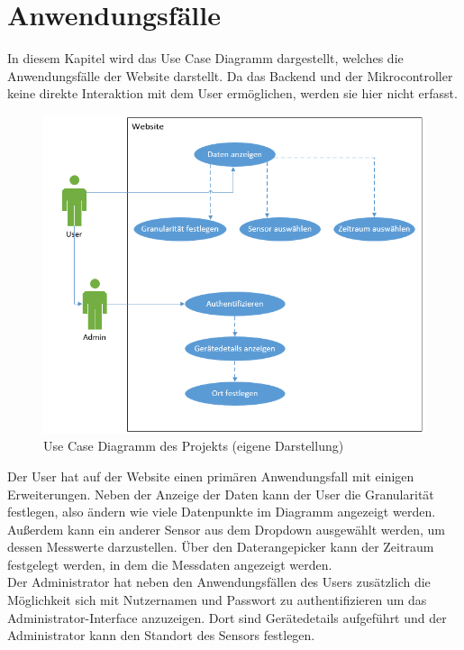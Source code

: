 \section{Anwendungsfälle}
In diesem Kapitel wird das Use Case Diagramm dargestellt, welches die Anwendungsfälle der Website darstellt. Da das Backend und der Mikrocontroller keine direkte Interaktion mit dem User ermöglichen, werden sie hier nicht erfasst.\\
\begin{figure}[h]
    \centering
    \includegraphics[width=0.7\linewidth]{img/usecase}
    \caption[Use Case Diagramm des Projekts]{Use Case Diagramm des Projekts (eigene Darstellung)}
    \label{fig:usecase}
\end{figure}

Der User hat auf der Website einen primären Anwendungsfall mit einigen Erweiterungen. Neben der Anzeige der Daten kann der User die Granularität festlegen, also ändern wie viele Datenpunkte im Diagramm angezeigt werden. Außerdem kann ein anderer Sensor aus dem Dropdown ausgewählt werden, um dessen Messwerte darzustellen. Über den Daterangepicker kann der Zeitraum festgelegt werden, in dem die Messdaten angezeigt werden. \\
Der Administrator hat neben den Anwendungsfällen des Users zusätzlich die Möglichkeit sich mit Nutzernamen und Passwort zu authentifizieren um das Administrator-Interface anzuzeigen. Dort sind Gerätedetails aufgeführt und der Administrator kann den Standort des Sensors festlegen.